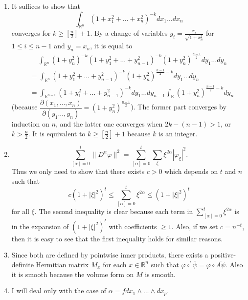 \begin{enumerate}
(c) Suppose $\{\alpha_{n}\}$ is a bounded sequence. Then $\{G \alpha_{n}\}$ is also bounded by (a), and $\{\Delta G \alpha_{n}\}$ is also bounded because
\[\|\Delta G \alpha_{n}\|=\|\alpha_{n}-H(\alpha_{n})\| \leq \|\alpha_{n}\|.\]
Then use 6.6 to obtain the result.
\item It suffices to show that
\[\int_{\mathbb{R}^{n}}\left(1+x_{1}^{2}+\ldots+x_{n}^{2}\right)^{-k} dx_{1} \ldots dx_{n}\]
converges for $k \geq\left[\frac{n}{2}\right]+1$. 
By a change of variables $y_{i}=\frac{x_{i}}{\sqrt{1+x_{n}^{2}}}$ for $1 \leq i \leq n-1$ and $y_{n}=x_{n}$, 
it is equal to
\begin{align*}
&\quad\ \int_{\mathbb{R}^{n}}\left(1+y_{n}^{2}\right)^{-k}\left(1+y_{1}^{2}+\ldots+y_{n-1}^{2}\right)^{-k}\left(1+y_{n}^{2}\right)^{\frac{n-1}{2}} dy_{1} \ldots dy_{n}\\
&=\int_{\mathbb{R}^{n}}\left(1+y_{1}^{2}+\ldots+y_{n-1}^{2}\right)^{-k}\left(1+y_{n}^{2}\right)^{\frac{n-1}{2}-k} dy_{1} \ldots dy_{n}\\
&=\int_{\mathbb{R}^{n-1}}\left(1+y_{1}^{2}+\ldots+y_{n-1}^{2}\right)^{-k} dy_{1} \ldots dy_{n-1}
\int_{\mathbb{R}}\left(1+y_{n}^{2}\right)^{\frac{n-1}{2}-k} dy_{n}
\end{align*}
(because $\dfrac{\partial(x_{1}, \ldots, x_{n})}{\partial(y_{1} \ldots, y_{n})}=(1+y_{n}^{2})^{\frac{n-1}{2}}$). 
The former part converges by induction on $n$, and the latter one converges when $2 k-(n-1)>1$, or $k>\frac{n}{2}$. 
It is equivalent to $k \geq\left[\frac{n}{2}\right]+1$ because $k$ is an integer.
\item \[\sum_{[\alpha]=0}^{t}\|D^{\alpha} \varphi\|^{2}
=\sum_{[\alpha]=0}^{t} \sum_{\xi} \xi^{2 \alpha}|\varphi_{\xi}|^{2}.\]
Thus we only need to show that there exists $c>0$ which depends on $t$ and $n$ such that
\[c(1+|\xi|^{2})^{t} \leq \sum_{[\alpha]=0}^{t} \xi^{2 \alpha} \leq(1+|\xi|^{2})^{t}\]
for all $\xi$. The second inequality is clear because each term in $\sum\limits_{[\alpha]=0}^{t} \xi^{2 \alpha}$ is in the expansion of $(1+|\xi|^{2})^{t}$ with coefficients $\geq 1$. 
Also, if we set $c=n^{-t}$, then it is easy to see that the first inequality holds for similar reasons.
\item Since both are defined by pointwise inner products, there exists a positive-definite Hermitian matrix $M_{x}$ for each $x \in \mathbb{R}^{n}$ such that $\varphi \circ^{\prime} \bar{\psi}=\varphi \circ \overline{A \psi}$. 
Also it is smooth because the volume form on $M$ is smooth.
\item I will deal only with the case of  $\alpha=f dx_{1} \wedge \ldots \wedge dx_{p}$. 

\end{enumerate}
